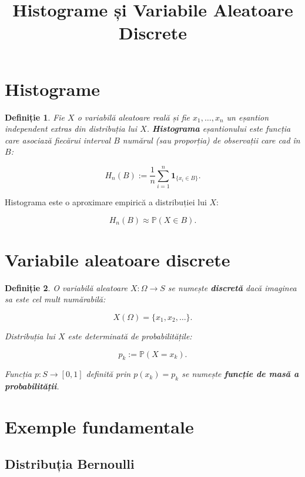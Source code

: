 \documentclass[12pt]{article}
\title{Histograme și Variabile Aleatoare Discrete}
\author{}
\date{}
\theoremstyle{plain}
\newtheorem{definition}{Definiție}
\begin{document}
\maketitle

\section{Histograme}

\begin{definition}
Fie $X$ o variabilă aleatoare reală și fie $x_1, \dots, x_n$ un eșantion
independent extras din distribuția lui $X$.
\textbf{Histograma} eșantionului este funcția care asociază fiecărui interval
$B$ numărul (sau proporția) de observații care cad în $B$:


\[
H_n(B) := \frac{1}{n} \sum_{i=1}^n \mathbf{1}_{\{x_i \in B\}}.
\]


\end{definition}

Histograma este o aproximare empirică a distribuției lui $X$:


\[
H_n(B) \approx \mathbb{P}(X \in B).
\]



\section{Variabile aleatoare discrete}

\begin{definition}
O variabilă aleatoare $X : \Omega \to S$ se numește
\textbf{discretă} dacă imaginea sa este cel mult numărabilă:


\[
X(\Omega) = \{x_1, x_2, \dots\}.
\]


Distribuția lui $X$ este determinată de probabilitățile:


\[
p_k := \mathbb{P}(X = x_k).
\]


Funcția $p : S \to [0,1]$ definită prin $p(x_k) = p_k$ se numește
\textbf{funcție de masă a probabilității}.
\end{definition}

\section{Exemple fundamentale}

\subsection{Distribuția Bernoulli}
\end{document}

